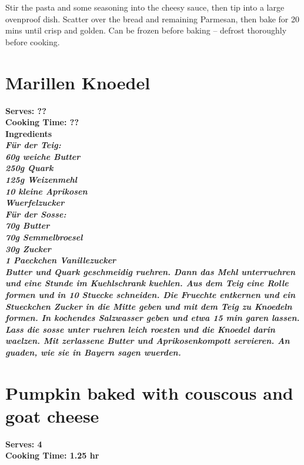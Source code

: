 \documentclass[18pt, oneside]{book}
\begin{document}
Stir the pasta and some seasoning into the cheesy sauce, then tip into a large ovenproof dish. Scatter over the bread and remaining Parmesan, then bake for 20 mins until crisp and golden. Can be frozen before baking – defrost thoroughly before cooking. \\
   
\section{Marillen Knoedel}
\bf{Serves: ??} \\
\bf{Cooking Time: ??} \\

\bf{Ingredients} \normalfont \\
\it{F\"{u}r der Teig}: \normalfont \\
60g weiche Butter \\
250g Quark           \\                 
125g Weizenmehl   \\
10 kleine Aprikosen \\
Wuerfelzucker \\

\it{F\"{u}r der Sosse}: \normalfont \\
70g Butter \\
70g Semmelbroesel \\
30g Zucker \\
1 Paeckchen Vanillezucker \\

Butter und Quark geschmeidig ruehren. Dann das Mehl unterruehren und eine Stunde im Kuehlschrank kuehlen. Aus dem Teig eine Rolle formen und in 10 Stuecke schneiden. Die Fruechte entkernen und ein Stueckchen Zucker in die Mitte geben und mit dem Teig zu Knoedeln formen. In kochendes Salzwasser geben und etwa 15 min garen lassen. \\


Lass die sosse unter ruehren leich roesten und die Knoedel darin waelzen. Mit zerlassene Butter und Aprikosenkompott servieren. An guaden, wie sie in Bayern sagen wuerden. \\

\section{Pumpkin baked with couscous and goat cheese}
\bf{Serves: 4} \\
\bf{Cooking Time: 1.25 hr} \\
\end{document}
